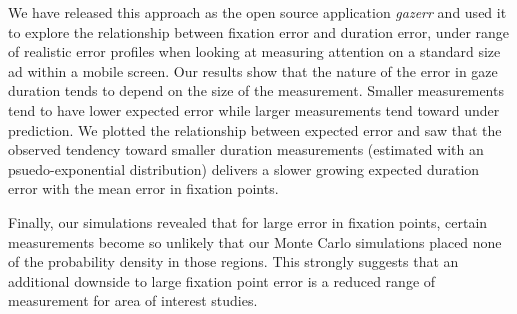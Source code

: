 \documentclass[12pt,a4paper]{article}
\numberwithin{equation}{section}
\begin{document}
We have released this approach as the open source application \textit{gazerr} and 
used it to explore the relationship between fixation error and duration error, under
range of realistic error profiles when looking at measuring attention on a standard
size ad within a mobile screen. Our results show that the nature
of the error in gaze duration tends to depend on the size of the measurement. 
Smaller measurements tend to have lower expected error while larger measurements 
tend toward under prediction. 
We plotted the relationship between expected error and saw that the observed 
tendency toward smaller duration measurements 
(estimated with an psuedo-exponential distribution) delivers a slower growing
expected duration error with the mean error in fixation points.

Finally, our simulations revealed that for large error in fixation points, 
certain measurements become so unlikely that our Monte Carlo simulations placed 
none of the probability density in those regions. 
This strongly suggests that an additional downside to large fixation point error
is a reduced range of measurement for area of interest studies.



\end{document}
